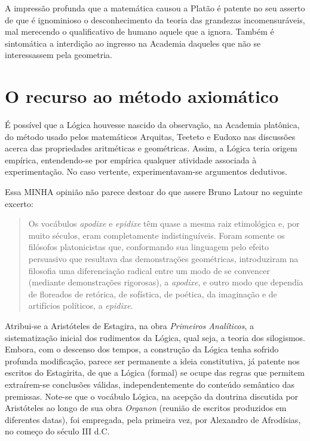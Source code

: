 \documentclass{hipatia}
\begin{document}
A impressão profunda que a matemática causou a Platão é patente no seu asserto de que é ignominioso o desconhecimento da teoria das grandezas incomensuráveis, mal merecendo o qualificativo de humano aquele que a ignora. Também é sintomática a interdição ao ingresso na Academia daqueles que não se interessassem pela geometria. \cite[p. 21]{lanczos1970}\cite[p. 209--210]{russell1945}  


\section{O recurso ao método axiomático}

É possível que a Lógica houvesse nascido da observação, na Academia platônica, do método usado pelos matemáticos Arquitas, Teeteto e Eudoxo nas discussões acerca das propriedades aritméticas e geométricas. Assim, a Lógica teria origem empírica, entendendo-se por empírica qualquer atividade associada à experimentação. No caso vertente, experimentavam-se argumentos dedutivos.

Essa MINHA opinião não parece destoar do que assere Bruno Latour no seguinte excerto:
\begin{quote}
    Os vocábulos \emph{apodixe} e \emph{epidixe} têm quase a mesma raiz etimológica e, por muito séculos, eram completamente indistinguíveis. Foram somente os filósofos platonicistas que, conformando sua linguagem pelo efeito persuasivo que resultava das demonstrações geométricas, introduziram na filosofia uma diferenciação radical entre um modo de se convencer (mediante demonstrações rigorosas), a \emph{apodixe}, e outro modo que dependia de floreados de retórica, de sofística, de poética, da imaginação e de artifícios políticos, a \emph{epidixe}. \cite[p. 445--446]{latour2008}
\end{quote}

Atribui-se a Aristóteles de Estagira, na obra \emph{Primeiros Analíticos}, a sistematização inicial dos rudimentos da Lógica, qual seja, a teoria dos silogismos. Embora, com o descenso dos tempos, a construção da Lógica tenha sofrido profunda modificação, parece ser permanente a ideia constitutiva, já patente nos escritos do Estagirita, de que a Lógica (formal) se ocupe das regras que permitem extraírem-se conclusões válidas, independentemente do conteúdo semântico das premissas. Note-se que o vocábulo Lógica, na acepção da doutrina discutida por Aristóteles ao longo de sua obra \emph{Organon} (reunião de escritos produzidos em diferentes datas), foi empregada, pela primeira vez, por Alexandro de Afrodísias, no começo do século III d.C. 
\end{document}
